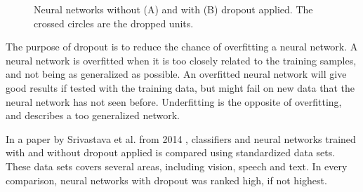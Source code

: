 \begin{figure}[H]
\begin{subfigure}{1\textwidth}
    \caption{}
    \label{fig:net_with_dropout}
    \end{subfigure}
\caption{Neural networks without (A) and with (B) dropout applied. The crossed circles are the dropped units.}
\label{fig:dropout_comparison}
\end{figure}

The purpose of dropout is to reduce the chance of overfitting a neural network. A neural network is overfitted when it is too closely related to the training samples, and not being as generalized as possible. An overfitted neural network will give good results if tested with the training data, but might fail on new data that the neural network has not seen before. Underfitting is the opposite of overfitting, and describes a too generalized network. %

In a paper by Srivastava et al. from 2014 \cite{srivastava_dropout:_2014}, classifiers and neural networks trained with and without dropout applied is compared using standardized data sets. These data sets covers several areas, including vision, speech and text. In every comparison, neural networks with dropout was ranked high, if not highest.

